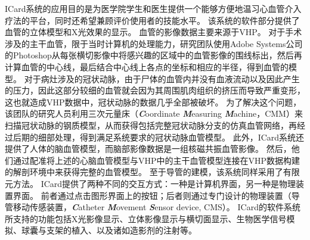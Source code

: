ICard系统的应用目的是为医学院学生和医生提供一个能够方便地温习心血管介入疗法的平台，同时还希望兼顾评价使用者的技能水平。
该系统的软件部分提供了血管的立体模型和X光效果的显示\cite{Wang1998ICard}\cite{Wang1998aICard}。
血管的影像数据主要来源于VHP。
对于手术涉及的主干血管，限于当时计算机的处理能力，研究团队使用Adobe Systems公司的Photoshop从每张横切影像中将感兴趣的区域中的血管影像的围线标出，然后再计算血管的中心线，最后结合中心线上各点的坐标和相应的半径，得到血管的模型\cite{Wang1998ICard}。
对于病灶涉及的冠状动脉，由于尸体的血管内并没有血液流动以及因此产生的压力，因此这部分较细的血管就会因为其周围肌肉组织的挤压而导致严重变形，这也就造成VHP数据中，冠状动脉的数据几乎全部被破坏\cite{Wang1998ICard}。
为了解决这个问题，该团队的研究人员利用三次元量床（\textbf{\textit{C}}oordinate \textbf{\textit{M}}easuring \textbf{\textit{M}}achine，CMM）\cite{CMMweb}来扫描冠状动脉的钢质模型\cite{KyotoModelweb}，从而获得包括完整冠状动脉分支的仿真血管网络，再经过后期的细部处理，得到满足系统要求的冠状动脉血管模型\cite{Wang1998ICard}。
此外，ICard系统还提供了人体的脑血管模型\cite{Serra1997Vessel}\cite{Poston1995Vessel}，而脑部影像数据是一组核磁共振血管影像\cite{Wang1998ICard}。
然后，他们通过配准将上述的心脑血管模型与VHP中的主干血管模型连接在VHP数据构建的解剖环境中来获得完整的血管模型\cite{Wang1998ICard}。
至于导管的建模，该系统同样采用了有限元方法\cite{Wang1998ICard}。
ICard提供了两种不同的交互方式：一种是计算机界面，另一种是物理装置界面\cite{Wang1998ICard}。
前者通过点击图形界面上的按钮；后者则通过专门设计的物理装置（导管移动传感装置，\textbf{\textit{C}}atheter \textbf{\textit{M}}ovement \textbf{\textit{S}}ensor device, CMS）\cite{Lim1998ICard}\cite{Lim1997ICard}。
ICard的软件系统所支持的功能包括X光影像显示、立体影像显示与横切面显示、生物医学信号模拟、球囊与支架的植入、以及诸如造影剂的注射等\cite{Wang1998ICard}。

